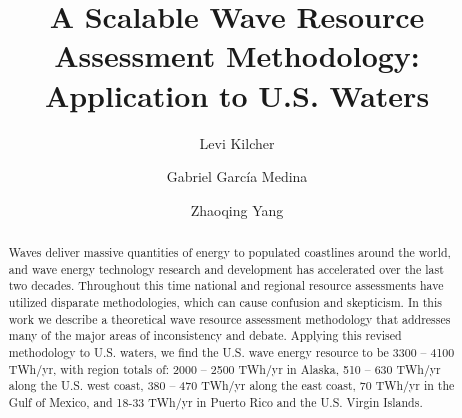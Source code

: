 \documentclass[authoryear,preprint,review,12pt]{elsarticle}
\begin{document}
\begin{frontmatter}

\title{A Scalable Wave Resource Assessment Methodology: Application to U.S. Waters}

\author[a1]{Levi Kilcher}

\author[a2]{Gabriel Garc\'ia Medina}
\author[a2,a3]{Zhaoqing Yang}


\begin{abstract}
Waves deliver massive quantities of energy to populated coastlines around the world, and wave energy technology research and development has accelerated over the last two decades. Throughout this time national and regional resource assessments have utilized disparate methodologies, which can cause confusion and skepticism. In this work we describe a theoretical wave resource assessment methodology that addresses many of the major areas of inconsistency and debate. Applying this revised methodology to U.S. waters, we find the U.S. wave energy resource to be 3300 – 4100 TWh/yr, with region totals of: 2000 – 2500 TWh/yr in Alaska, 510 – 630 TWh/yr along the U.S. west coast, 380 – 470 TWh/yr along the east coast, 70 TWh/yr in the Gulf of Mexico, and 18-33 TWh/yr in Puerto Rico and the U.S. Virgin Islands.
\end{abstract}



\end{frontmatter}
\end{document}
